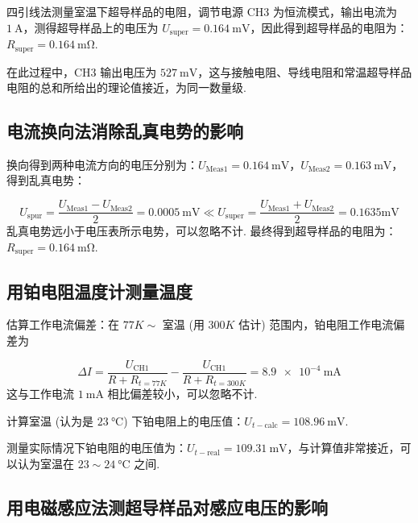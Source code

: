 \documentclass{THUexprep}
\begin{document}
四引线法测量室温下超导样品的电阻，调节电源 CH3 为恒流模式，输出电流为 $\SI{1}{\ampere}$，测得超导样品上的电压为 $U_\text{super}=\SI{0.164}{\milli\volt}$，因此得到超导样品的电阻为：$R_\text{super}=\SI{0.164}{\milli\ohm}$.

在此过程中，CH3 输出电压为 $\SI{527}{\milli\volt}$，这与接触电阻、导线电阻和常温超导样品电阻的总和所给出的理论值接近，为同一数量级.

\subsection{电流换向法消除乱真电势的影响}

换向得到两种电流方向的电压分别为：$U_\text{Meas1}=\SI{0.164}{\milli\volt}$，$U_\text{Meas2}=\SI{0.163}{\milli\volt}$，得到乱真电势：

\begin{equation}
    U_\text{spur} = \frac{U_\text{Meas1} - U_\text{Meas2}}{2} = \SI{0.0005}{\milli\volt}\ll U_\text{super}=\frac{U_\text{Meas1}+U_\text{Meas2}}{2}=0.1635\si{\milli\volt}
\end{equation}
\newline
乱真电势远小于电压表所示电势，可以忽略不计. 最终得到超导样品的电阻为：$R_\text{super}=\SI{0.164}{\milli\ohm}$.

\subsection{用铂电阻温度计测量温度}

估算工作电流偏差：在 $\si{77}{K}\sim$ 室温 (用 $\si{300}{K}$ 估计) 范围内，铂电阻工作电流偏差为

\begin{equation}
    \Delta I = \frac{U_{\text{CH1}}}{R+R_{t=\si{77}{K}}} - \frac{U_{\text{CH1}}}{R+R_{t=\si{300}{K}}} = \SI{8.9e-4}{\milli\ampere}
\end{equation}
\newline
这与工作电流 $\SI{1}{\milli\ampere}$ 相比偏差较小，可以忽略不计.

计算室温 (认为是 $\SI{23}{\celsius}$) 下铂电阻上的电压值：$U_{t-\text{calc}}=\SI{108.96}{\milli\volt}$.

测量实际情况下铂电阻的电压值为：$U_{t-\text{real}}=\SI{109.31}{\milli\volt}$，与计算值非常接近，可以认为室温在 $23\sim\SI{24}{\celsius}$ 之间.

\subsection{用电磁感应法测超导样品对感应电压的影响}
\end{document}
